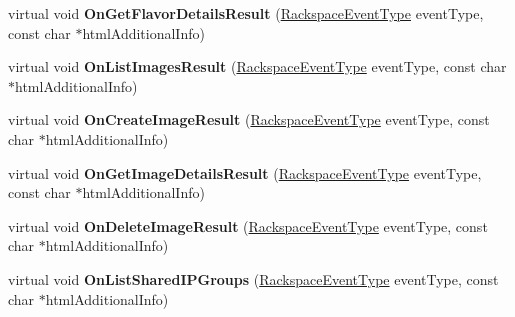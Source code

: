 \begin{DoxyCompactItemize}
\item 
\hypertarget{class_rak_net_1_1_rackspace_event_callback___default_a46c3f32c3d00f7dc8b17cffb2c3cac7b}{virtual void {\bfseries On\-Get\-Flavor\-Details\-Result} (\hyperlink{namespace_rak_net_a120cf6e1a0904cff45269f14c3c4c289}{Rackspace\-Event\-Type} event\-Type, const char $\ast$html\-Additional\-Info)}\label{class_rak_net_1_1_rackspace_event_callback___default_a46c3f32c3d00f7dc8b17cffb2c3cac7b}

\item 
\hypertarget{class_rak_net_1_1_rackspace_event_callback___default_ae1f44bd8d89a49546b4d99dfcbec4fb1}{virtual void {\bfseries On\-List\-Images\-Result} (\hyperlink{namespace_rak_net_a120cf6e1a0904cff45269f14c3c4c289}{Rackspace\-Event\-Type} event\-Type, const char $\ast$html\-Additional\-Info)}\label{class_rak_net_1_1_rackspace_event_callback___default_ae1f44bd8d89a49546b4d99dfcbec4fb1}

\item 
\hypertarget{class_rak_net_1_1_rackspace_event_callback___default_a12818f415f108233280723733cd2bfb4}{virtual void {\bfseries On\-Create\-Image\-Result} (\hyperlink{namespace_rak_net_a120cf6e1a0904cff45269f14c3c4c289}{Rackspace\-Event\-Type} event\-Type, const char $\ast$html\-Additional\-Info)}\label{class_rak_net_1_1_rackspace_event_callback___default_a12818f415f108233280723733cd2bfb4}

\item 
\hypertarget{class_rak_net_1_1_rackspace_event_callback___default_abe603ec6547f63eccd6b167799c06db3}{virtual void {\bfseries On\-Get\-Image\-Details\-Result} (\hyperlink{namespace_rak_net_a120cf6e1a0904cff45269f14c3c4c289}{Rackspace\-Event\-Type} event\-Type, const char $\ast$html\-Additional\-Info)}\label{class_rak_net_1_1_rackspace_event_callback___default_abe603ec6547f63eccd6b167799c06db3}

\item 
\hypertarget{class_rak_net_1_1_rackspace_event_callback___default_a99380b2aee071580a30a4207a18c87f6}{virtual void {\bfseries On\-Delete\-Image\-Result} (\hyperlink{namespace_rak_net_a120cf6e1a0904cff45269f14c3c4c289}{Rackspace\-Event\-Type} event\-Type, const char $\ast$html\-Additional\-Info)}\label{class_rak_net_1_1_rackspace_event_callback___default_a99380b2aee071580a30a4207a18c87f6}

\item 
\hypertarget{class_rak_net_1_1_rackspace_event_callback___default_aa09201aba2b1c4b884202a781e3c538e}{virtual void {\bfseries On\-List\-Shared\-I\-P\-Groups} (\hyperlink{namespace_rak_net_a120cf6e1a0904cff45269f14c3c4c289}{Rackspace\-Event\-Type} event\-Type, const char $\ast$html\-Additional\-Info)}\label{class_rak_net_1_1_rackspace_event_callback___default_aa09201aba2b1c4b884202a781e3c538e}


\end{DoxyCompactItemize}
